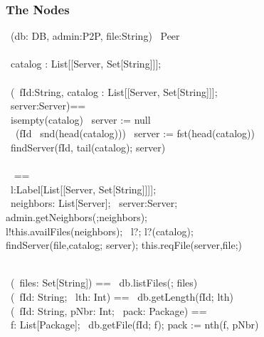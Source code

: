 \documentclass[handout]
{beamer}
\begin{document}
\begin{frame}
\frametitle{The Nodes}
\begin{small}
\CLASS\ (db: DB, admin:P2P, file:String) \IMPLEMENTS\ Peer\\
\BEGIN\\
\innrykk \VAR\ catalog : List[[Server, Set[String]]];\\
\quad \\
\innrykk \OP\ (\IN\ fId:String, catalog : List[[Server, Set[String]]]; \\
\innrykk \innrykk \innrykk \innrykk \innrykk \innrykk \innrykk \innrykk \innrykk 
\OUT\ server:Server)==\\
\innrykk \innrykk \innrykk       \IF\ isempty(catalog) \THEN\ server := null \\
\innrykk \innrykk \innrykk \innrykk       \ELSE\ \IF\ (fId \IN\ snd(head(catalog))) \THEN\ server := fst(head(catalog)) \\
\innrykk \innrykk \innrykk \innrykk \innrykk            \ELSE\ findServer(fId, tail(catalog); server) \END\ \END\\
\quad \\
\innrykk \OP\  == \\
\innrykk \innrykk     \VAR\ l:Label[List[[Server, Set[String]]]]; \\
\innrykk \innrykk \innrykk     \VAR\ neighbors: List[Server]; \VAR\ server:Server;\\
\innrykk \innrykk \innrykk \innrykk admin.getNeighbors(;neighbors); \\
\innrykk \innrykk \innrykk \innrykk \innrykk     l!this.availFiles(neighbors); \AWAIT\ l?; l?(catalog);\\
\innrykk \innrykk \innrykk \innrykk \innrykk \innrykk     findServer(file,catalog; server); this.reqFile(server,file;)
\end{small}
\end{frame}

\begin{frame}

\bigskip

\begin{small}
\innrykk   {}\\
\innrykk \innrykk \OP\ (\OUT\ files: Set[String]) == 
\AWAIT\ db.listFiles(; files)\\
\innrykk \innrykk \OP\ (\IN\ fId: String; \OUT\ lth: Int) == \AWAIT\  db.getLength(fId; lth)\\
\innrykk \innrykk \OP\ (\IN\ fId: String, pNbr: Int; \OUT\ pack: Package) ==\\
\innrykk \innrykk \innrykk \VAR\ f: List[Package]; \AWAIT\ db.getFile(fId; f); pack := nth(f, pNbr)\\
\end{small}
\end{frame}
\end{document}
